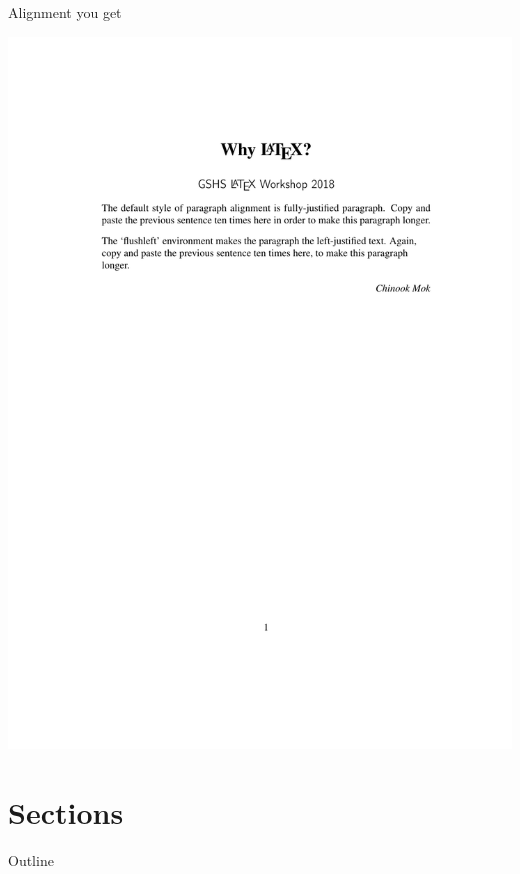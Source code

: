 \documentclass[12pt]{gshs_lecture}
\begin{document}
\begin{frame}[t]{Alignment}\small
you get
\begin{center}
\begin{framed}
\includegraphics[width=\textwidth,trim={1cm 18cm 1cm 4cm},clip]{./test_article/article001.pdf}

\end{framed}
\end{center}
\end{frame}


\section{Sections} %

\begin{frame}[t]{Outline}
\tableofcontents[currentsection]
\end{frame}
\end{document}

